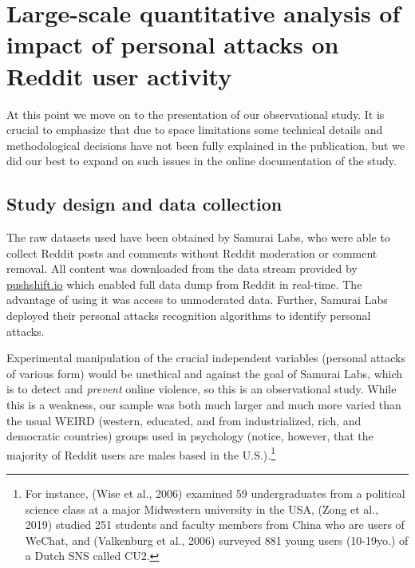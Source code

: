 \documentclass[10pt,dvipsnames]{scrartcl}
\begin{document}
\section{Large-scale quantitative analysis of impact of personal attacks on
Reddit user activity}
\label{quantanalysis}

At this point we move on to the presentation of our observational study.
It is crucial to emphasize that due to space limitations some technical
details and methodological decisions have not been fully explained in
the publication, but we did our best to expand on such issues in the
online documentation of the study.

\subsection{Study design and data collection}

The raw datasets used have been obtained by \textsf{Samurai Labs}, who
were able to collect \textsf{Reddit} posts and comments without
\textsf{Reddit} moderation or comment removal. All content was
downloaded from the data stream provided by \url{pushshift.io} which
enabled full data dump from Reddit in real-time. The advantage of using
it was access to unmoderated data. Further, \textsf{Samurai Labs}
deployed their personal attacks recognition algorithms to identify
personal attacks.

Experimental manipulation of the crucial independent variables (personal
attacks of various form) would be unethical and against the goal of
\textsf{Samurai Labs}, which is to detect and \emph{prevent} online
violence, so this is an observational study. While this is a weakness,
our sample was both much larger and much more varied than the usual
WEIRD (western, educated, and from industrialized, rich, and democratic
countries) groups used in psychology (notice, however, that the majority
of Reddit users are males based in the U.S.).\footnote{For instance,
  (Wise et al., 2006) examined 59 undergraduates from a political
  science class at a major Midwestern university in the USA, (Zong et
  al., 2019) studied 251 students and faculty members from China who are
  users of WeChat, and (Valkenburg et al., 2006) surveyed 881 young
  users (10-19yo.) of a Dutch SNS called CU2.}
\end{document}
